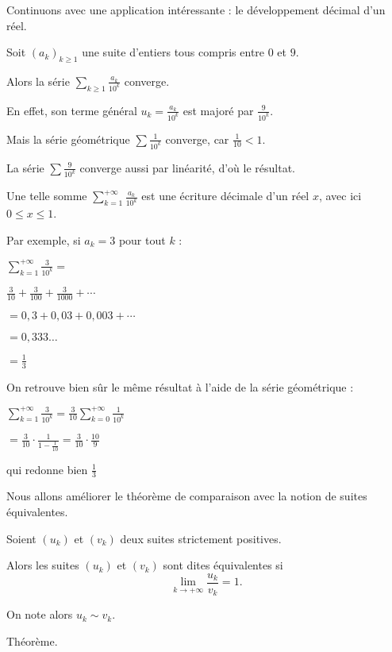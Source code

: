 \diapo

Continuons avec une application intéressante : le développement décimal d'un réel.

Soit $(a_k)_{k\ge 1}$ une suite d'entiers tous compris entre $0$ et $9$. 

Alors la série $\displaystyle\sum_{k\geq1}\frac{a_k}{10^k}$
converge.

\change
En effet, son terme général $u_k=\frac{a_k}{10^k}$ est majoré par $\frac{9}{10^k}$. 

\change
Mais la série géométrique $\sum \frac{1}{10^k}$ converge, car $\frac{1}{10}<1$. 

\change
La série 
$\sum \frac{9}{10^k}$ converge aussi par linéarité, d'où le résultat.

\change
Une telle somme $\displaystyle\sum_{k=1}^{+\infty} \frac{a_k}{10^k}$ est une écriture décimale d'un réel
$x$, avec ici $0 \le x \le 1$.

\change
Par exemple, si $a_k = 3$ pour tout $k$ : 

$\displaystyle\sum_{k=1}^{+\infty} \frac{3}{10^k} =$

\change
$ \frac{3}{10}+\frac{3}{100}+\frac{3}{1000}+\cdots$

\change
$= 0,3+0,03+0,003+\cdots$

\change
$ = 0,333\ldots$

\change
$= \frac13$

\change
On retrouve bien sûr le même résultat à l'aide de la série géométrique :

$\displaystyle\sum_{k=1}^{+\infty} \frac{3}{10^k} 
= \frac{3}{10} \sum_{k=0}^{+\infty} \frac{1}{10^k}$

\change
$
=  \frac{3}{10} \cdot \frac{1}{1-\frac{1}{10}}
=  \frac{3}{10} \cdot \frac{10}{9}$

qui redonne bien
$ \frac13$

\diapo

Nous allons améliorer le théorème de comparaison avec la notion de suites équivalentes.

Soient $(u_k)$ et $(v_k)$ deux suites strictement positives. 

\change
Alors les suites $(u_k)$ et $(v_k)$ sont dites équivalentes si 
$$\lim_{k\to+\infty} \frac{u_k}{v_k}=1.$$

\change
On note alors $u_k \sim v_k.$

\change
Théorème.

